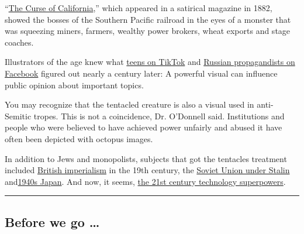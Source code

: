 ``\href{http://nationalhumanitiescenter.org/pds/gilded/power/text1/octopusimages.pdf}{The
Curse of California},'' which appeared in a satirical magazine in 1882,
showed the bosses of the Southern Pacific railroad in the eyes of a
monster that was squeezing miners, farmers, wealthy power brokers, wheat
exports and stage coaches.

Illustrators of the age knew what
\href{https://www.nytimes3xbfgragh.onion/2020/05/07/style/memers-are-taking-over-tiktok.html}{teens
on TikTok} and
\href{https://www.nytimes3xbfgragh.onion/2017/11/01/us/politics/russia-2016-election-facebook.html}{Russian
propagandists on Facebook} figured out nearly a century later: A
powerful visual can influence public opinion about important topics.

You may recognize that the tentacled creature is also a visual used in
anti-Semitic tropes. This is not a coincidence, Dr. O'Donnell said.
Institutions and people who were believed to have achieved power
unfairly and abused it have often been depicted with octopus images.

In addition to Jews and monopolists, subjects that got the tentacles
treatment included
\href{https://fineartamerica.com/featured/imperialism-cartoon-1882-granger.html}{British
imperialism} in the 19th century, the
\href{https://www.popsci.com/article/technology/brief-history-octopi-taking-over-world/}{Soviet
Union under Stalin}
and\href{https://digital.library.cornell.edu/catalog/ss:3293931}{1940s
Japan}. And now, it seems,
\href{https://www.esquire.com/news-politics/a15895746/bust-big-tech-silicon-valley}{the
21st century technology superpowers}.

\begin{center}\rule{0.5\linewidth}{\linethickness}\end{center}

\hypertarget{before-we-go-}{%
\subsection{Before we go \ldots{}}\label{before-we-go-}}

